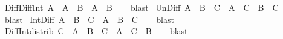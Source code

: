 \begin{isabellebody}
\isanewline
{}\isamarkupfalse%
\ Diff{\isacharunderscore}{\kern0pt}Diff{\isacharunderscore}{\kern0pt}Int{\isacharcolon}{\kern0pt}\ {\isachardoublequoteopen}A\ {\isacharminus}{\kern0pt}\ {\isacharparenleft}{\kern0pt}A\ {\isacharminus}{\kern0pt}\ B{\isacharparenright}{\kern0pt}\ {\isacharequal}{\kern0pt}\ A\ {\isasyminter}\ B{\isachardoublequoteclose}\isanewline
%
\isadelimproof
\ \ %
\endisadelimproof
%
\isatagproof
{}\isamarkupfalse%
\ blast%
\endisatagproof
{\isafoldproof}%
%
\isadelimproof
\isanewline
%
\endisadelimproof
\isanewline
{}\isamarkupfalse%
\ Un{\isacharunderscore}{\kern0pt}Diff{\isacharcolon}{\kern0pt}\ {\isachardoublequoteopen}{\isacharparenleft}{\kern0pt}A\ {\isasymunion}\ B{\isacharparenright}{\kern0pt}\ {\isacharminus}{\kern0pt}\ C\ {\isacharequal}{\kern0pt}\ {\isacharparenleft}{\kern0pt}A\ {\isacharminus}{\kern0pt}\ C{\isacharparenright}{\kern0pt}\ {\isasymunion}\ {\isacharparenleft}{\kern0pt}B\ {\isacharminus}{\kern0pt}\ C{\isacharparenright}{\kern0pt}{\isachardoublequoteclose}\isanewline
%
\isadelimproof
\ \ %
\endisadelimproof
%
\isatagproof
{}\isamarkupfalse%
\ blast%
\endisatagproof
{\isafoldproof}%
%
\isadelimproof
\isanewline
%
\endisadelimproof
\isanewline
{}\isamarkupfalse%
\ Int{\isacharunderscore}{\kern0pt}Diff{\isacharcolon}{\kern0pt}\ {\isachardoublequoteopen}{\isacharparenleft}{\kern0pt}A\ {\isasyminter}\ B{\isacharparenright}{\kern0pt}\ {\isacharminus}{\kern0pt}\ C\ {\isacharequal}{\kern0pt}\ A\ {\isasyminter}\ {\isacharparenleft}{\kern0pt}B\ {\isacharminus}{\kern0pt}\ C{\isacharparenright}{\kern0pt}{\isachardoublequoteclose}\isanewline
%
\isadelimproof
\ \ %
\endisadelimproof
%
\isatagproof
{}\isamarkupfalse%
\ blast%
\endisatagproof
{\isafoldproof}%
%
\isadelimproof
\isanewline
%
\endisadelimproof
\isanewline
{}\isamarkupfalse%
\ Diff{\isacharunderscore}{\kern0pt}Int{\isacharunderscore}{\kern0pt}distrib{\isacharcolon}{\kern0pt}\ {\isachardoublequoteopen}C\ {\isasyminter}\ {\isacharparenleft}{\kern0pt}A\ {\isacharminus}{\kern0pt}\ B{\isacharparenright}{\kern0pt}\ {\isacharequal}{\kern0pt}\ {\isacharparenleft}{\kern0pt}C\ {\isasyminter}\ A{\isacharparenright}{\kern0pt}\ {\isacharminus}{\kern0pt}\ {\isacharparenleft}{\kern0pt}C\ {\isasyminter}\ B{\isacharparenright}{\kern0pt}{\isachardoublequoteclose}\isanewline
%
\isadelimproof
\ \ %
\endisadelimproof
%
\isatagproof
{}\isamarkupfalse%
\ blast%
\endisatagproof
{\isafoldproof}%
%
\isadelimproof
\isanewline
%
\endisadelimproof
\isanewline
{}\isamarkupfalse%

\end{isabellebody}
